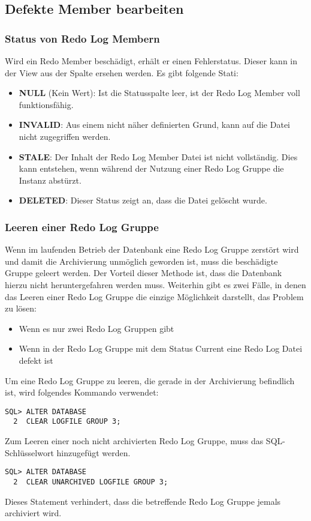       \subsection{Defekte Member bearbeiten}
        \subsubsection{Status von Redo Log Membern}
          Wird ein Redo Member beschädigt, erhält er einen Fehlerstatus. Dieser kann in der View  aus der Spalte  ersehen werden. Es gibt folgende Stati:
          \begin{itemize}
          \item \textbf{NULL} (Kein Wert): Ist die Statusspalte leer, ist der Redo Log Member voll funktionsfähig.
          \item \textbf{INVALID}: Aus einem nicht näher definierten Grund, kann auf die Datei nicht zugegriffen werden.
          \item \textbf{STALE}: Der Inhalt der Redo Log Member Datei ist nicht vollständig. Dies kann entstehen, wenn während der Nutzung einer Redo Log Gruppe die Instanz abstürzt.
          \item \textbf{DELETED}: Dieser Status zeigt an, dass die Datei gelöscht wurde.
        \end{itemize}
\clearpage
        \subsubsection{Leeren einer Redo Log Gruppe}
          Wenn im laufenden Betrieb der Datenbank eine Redo Log Gruppe zerstört wird und damit die Archivierung unmöglich geworden ist, muss die beschädigte Gruppe geleert werden. Der Vorteil dieser Methode ist, dass die Datenbank hierzu nicht heruntergefahren werden muss. Weiterhin gibt es zwei Fälle, in denen das Leeren einer Redo Log Gruppe die einzige Möglichkeit darstellt, das Problem zu lösen:
          \begin{itemize}
            \item Wenn es nur zwei Redo Log Gruppen gibt
            \item Wenn in der Redo Log Gruppe mit dem Status Current eine Redo Log Datei defekt ist
          \end{itemize}
          Um eine Redo Log Gruppe zu leeren, die gerade in der Archivierung befindlich ist, wird folgendes Kommando verwendet:
          \begin{lstlisting}[caption={Redo Log Gruppe leeren},label=admin46,language=oracle_sql]
SQL> ALTER DATABASE
  2  CLEAR LOGFILE GROUP 3;
        \end{lstlisting}
        Zum Leeren einer noch nicht archivierten Redo Log Gruppe, muss das SQL-Schlüsselwort  hinzugefügt werden.
        \begin{lstlisting}[caption={Eine nicht archivierte Redo Log Gruppe leeren},label=admin47,language=oracle_sql]
SQL> ALTER DATABASE
  2  CLEAR UNARCHIVED LOGFILE GROUP 3;
        \end{lstlisting}
        Dieses Statement verhindert, dass die betreffende Redo Log Gruppe jemals archiviert wird.
   
